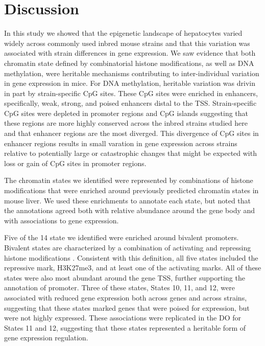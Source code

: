 \documentclass[
  11pt,
]{article}
\begin{document}
\hypertarget{discussion}{%
\section{Discussion}\label{discussion}}

In this study we showed that the epigenetic landscape of hepatocytes
varied widely across commonly used inbred mouse strains and that this
variation was associated with strain differences in gene expression. We
saw evidence that both chromatin state defined by combinatorial histone
modifications, as well as DNA methylation, were heritable mechanisms
contributing to inter-individual variation in gene expression in mice.
For DNA methylation, heritable variation was drivin in part by
strain-specific CpG sites. These CpG sites were enriched in enhancers,
specifically, weak, strong, and poised enhancers distal to the TSS.
Strain-specific CpG sites were depleted in promoter regions and CpG
islands suggesting that these regions are more highly conserved across
the inbred strains studied here and that enhancer regions are the most
diverged. This divergence of CpG sites in enhancer regions results in
small varation in gene expression across strains relative to potentially
large or catastrophic changes that might be expected with loss or gain
of CpG sites in promoter regions.

The chromatin states we identified were represented by combinations of
histone modifications that were enriched around previously predicted
chromatin states in mouse liver. We used these enrichments to annotate
each state, but noted that the annotations agreed both with relative
abundance around the gene body and with associations to gene expression.

Five of the 14 state we identified were enriched around bivalent
promoters. Bivalent states are characterized by a combination of
activating and repressing histone modifications
\citep{pmid23788621, pmid22513113}. Consistent with this definition, all
five states included the repressive mark, H3K27me3, and at least one of
the activating marks. All of these states were also most abundant around
the gene TSS, further supporting the annotation of promoter. Three of
these states, States 10, 11, and 12, were associated with reduced gene
expression both across genes and across strains, suggesting that these
states marked genes that were poised for expression, but were not highly
expressed. These associations were replicated in the DO for States 11
and 12, suggesting that these states represented a heritable form of
gene expression regulation.
\end{document}
